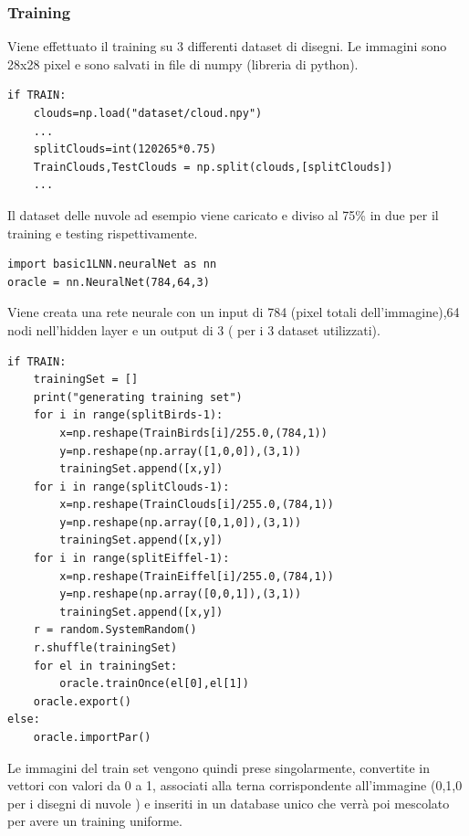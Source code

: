 \documentclass[12pt]{article}
\begin{document}
\subsubsection{Training}
Viene effettuato il training su 3 differenti dataset di disegni. Le immagini sono 28x28 pixel e sono salvati in file di numpy (libreria di python).
\begin{lstlisting}[language=myPython]
if TRAIN:
	clouds=np.load("dataset/cloud.npy")
	...
	splitClouds=int(120265*0.75)
	TrainClouds,TestClouds = np.split(clouds,[splitClouds])
	...
\end{lstlisting}
Il dataset delle nuvole ad esempio viene caricato e diviso al 75\% in due per il training e testing rispettivamente.
\begin{lstlisting}[language=myPython]
import basic1LNN.neuralNet as nn
oracle = nn.NeuralNet(784,64,3)
\end{lstlisting}
Viene creata una rete neurale con un input di 784 (pixel totali dell'immagine),64 nodi nell'hidden layer e un output di 3 ( per i 3 dataset utilizzati).
\newpage
\begin{lstlisting}[language=myPython]
if TRAIN:
	trainingSet = []
	print("generating training set")
	for i in range(splitBirds-1):
		x=np.reshape(TrainBirds[i]/255.0,(784,1))
		y=np.reshape(np.array([1,0,0]),(3,1))
		trainingSet.append([x,y])
	for i in range(splitClouds-1):
		x=np.reshape(TrainClouds[i]/255.0,(784,1))
		y=np.reshape(np.array([0,1,0]),(3,1))
		trainingSet.append([x,y])
	for i in range(splitEiffel-1):
		x=np.reshape(TrainEiffel[i]/255.0,(784,1))
		y=np.reshape(np.array([0,0,1]),(3,1))
		trainingSet.append([x,y])
	r = random.SystemRandom()
	r.shuffle(trainingSet)
	for el in trainingSet:
		oracle.trainOnce(el[0],el[1])
	oracle.export()
else:
	oracle.importPar()
\end{lstlisting}
Le immagini del train set vengono quindi prese singolarmente, convertite in vettori con valori da 0 a 1, associati alla terna corrispondente all'immagine (0,1,0 per i disegni di nuvole ) e inseriti in un database unico che verrà poi mescolato per avere un training uniforme.
\newpage
\end{document}
